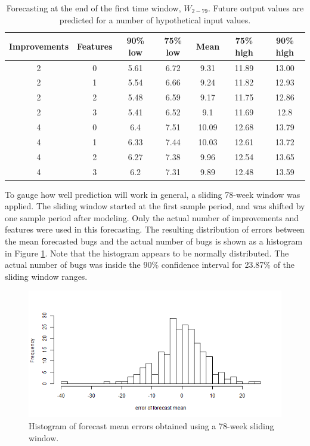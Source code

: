 \documentclass[letterpaper]{report}
\begin{document}
\begin{table}[htbp]
  \centering
  \begin{tabular}{ c | c | c | c | c | c | c }
    Improvements & Features & 90\% low & 75\% low & Mean & 75\% high & 90\% high \\
    \hline
2 & 0 & 5.61 & 6.72 & 9.31 & 11.89 & 13.00 \\
2 & 1 & 5.54 & 6.66 & 9.24 & 11.82 & 12.93 \\
2 & 2 & 5.48 & 6.59 & 9.17 & 11.75 & 12.86 \\
2 & 3 & 5.41 & 6.52 & 9.1 & 11.69 & 12.8 \\
4 & 0 & 6.4 & 7.51 & 10.09 & 12.68 & 13.79 \\
4 & 1 & 6.33 & 7.44 & 10.03 & 12.61 & 13.72 \\
4 & 2 & 6.27 & 7.38 & 9.96 & 12.54 & 13.65 \\
4 & 3 & 6.2 & 7.31 & 9.89 & 12.48 & 13.59 \\
    \hline
  \end{tabular}
\caption[Forecasting results]{Forecasting at the end of the first time window, $W_{2-79}$. Future output values are predicted for a number of hypothetical input values.}
\label{tab:forecasting_results}
\end{table}

To gauge how well prediction will work in general, a sliding 78-week window was applied. The sliding window started at the first sample period, and was shifted by one sample period after modeling. Only the actual number of improvements and features were used in this forecasting. The resulting distribution of errors between the mean forecasted bugs and the actual number of bugs is shown as a histogram in Figure \ref{fig:forecast_errors}. Note that the histogram appears to be normally distributed.  The actual number of bugs was inside the 90\% confidence interval for 23.87\% of the sliding window ranges.

\begin{figure}[htbp]
\centering
\includegraphics[width=\textwidth]{assets/forecast_errors}
\caption[Forecast errors]{Histogram of forecast mean errors obtained using a 78-week sliding window.}
\label{fig:forecast_errors}
\end{figure}
\end{document}
